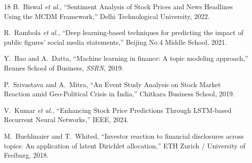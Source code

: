 \documentclass[11pt]{article}
\begin{document}
\begin{thebibliography}{18}
B.~Biswal \textit{et al.}, ``Sentiment Analysis of Stock Prices and News Headlines Using the MCDM Framework,'' Delhi Technological University, 2022.

R.~Rambola \textit{et al.}, ``Deep learning-based techniques for predicting the impact of public figures' social media statements,'' Beijing No.4 Middle School, 2021.

Y.~Bao and A.~Datta, ``Machine learning in finance: A topic modeling approach,'' Rennes School of Business, \textit{SSRN}, 2019.

P.~Srivastava and A.~Mitra, ``An Event Study Analysis on Stock Market Reaction amid Geo-Political Crisis in India,'' Chitkara Business School, 2019.

V.~Kumar \textit{et al.}, ``Enhancing Stock Price Predictions Through LSTM-based Recurrent Neural Networks,'' IEEE, 2024.

M.~Buehlmaier and T.~Whited, ``Investor reaction to financial disclosures across topics: An application of latent Dirichlet allocation,'' ETH Zurich / University of Freiburg, 2018.

\end{thebibliography}
\end{document}
